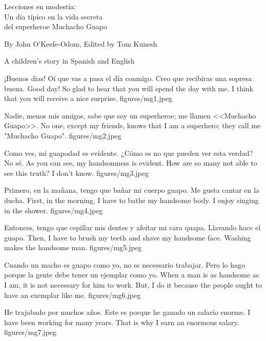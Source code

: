 \documentclass[10pt,twoside,openany]{book}
\newcommand{\booktitle}{Lecciones en modestía:\\  Un día típico en la vida secreta \\del superheroe Muchacho Guapo}
\begin{document}
\begin{titlepage}
  \thispagestyle{empty}
  \vspace*{\fill}
  \begin{center}
    {\chapterfont\fontsize{34}{40}\selectfont \booktitle\par}
    \vspace{1.5em}
    {\headingfont\fontsize{18}{24}\selectfont By John O'Keefe-Odom, Edited by Tom Kunesh\par}
    \vspace{2em}
    {\Large A children's story in Spanish and English\par}
  \end{center}
  \vspace*{\fill}
\end{titlepage}

\storyspread
  {¡Buenos dias!  Oí que vas a pasa el día conmigo.  Creo que recibiras una sopresa buena.}
  {Good day!  So glad to hear that you will spend the day with me.  I think that you will receive a nice surprise.}
  {figures/mg1.jpeg}

\storyspread
  {Nadie, menos mis amigos, sabe que soy un superheroe; me llamen <<Muchacho Guapo>>.}
  {No one, except my friends, knows that I am a superhero; they call me "Muchacho Guapo".}
  {figures/mg2.jpeg}


\storyspread
  {Como ves, mi guapodad es evidente.  ¿Cómo es no que pueden ver esta verdad? No sé. }
  {As you can see, my handsomness is evident.  How are so many not able to see this truth?  I don't know.}
  {figures/mg3.jpeg}

  \storyspread
  {Primero, en la mañana, tengo que bañar mi cuerpo guapo.  Me gusta cantar en la ducha.}
  {First, in the morning, I have to bathe my handsome body.  I enjoy singing in the shower.}
  {figures/mg4.jpeg}

  \storyspread
  {Entonces, tengo que cepillar mis dentes y afeitar mi cara quapa.  Llavando hace el guapo.}
  {Then, I have to brush my teeth and shave my handsome face.  Washing makes the handsome man.}
  {figures/mg5.jpeg}

  \storyspread
  {Cuando un macho es guapo como yo, no es necessario trabajar.  Pero lo hago porque la gente debe tener un ejemplar como yo.}
  {When a man is as handsome as I am, it is not necessary for him to work.  But, I do it because the people ought to have an exemplar like me.}
  {figures/mg6.jpeg}

  \storyspread
  {He trajabado por muchos años.  Este es porque he ganado un salarío enorme. }
  {I have been working for many years.  That is why I earn an enormous salary.}
  {figures/mg7.jpeg}
\end{document}
